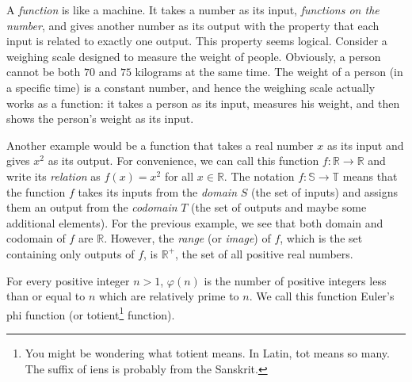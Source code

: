 \documentclass{subfile}
\begin{document}
	A \textit{function} is like a machine. It takes a number as its input, \textit{functions on the number}, and gives another number as its output with the property that each input is related to exactly one output. This property seems logical. Consider a weighing scale designed to measure the weight of people. Obviously, a person cannot be both $70$ and $75$ kilograms at the same time. The weight of a person (in a specific time) is a constant number, and hence the weighing scale actually works as a function: it takes a person as its input, measures his weight, and then shows the person's weight as its input.

	Another example would be a function that takes a real number $x$ as its input and gives $x^2$ as its output. For convenience, we can call this function $f: \mathbb R \to \mathbb R$ and write its \textit{relation} as $f(x) = x^2$ for all $x \in \mathbb R$. The notation $f: \mathbb S \to \mathbb T$ means that the function $f$ takes its inputs from the \textit{domain} $S$ (the set of inputs) and assigns them an output from the \textit{codomain} $T$ (the set of outputs and maybe some additional elements). For the previous example, we see that both domain and codomain of $f$ are $\mathbb R$. However, the \textit{range} (or \textit{image}) of $f$, which is the set containing only outputs of $f$, is $\mathbb R^{+}$, the set of all positive real numbers.

		\begin{definition}\label{def:totient}
			For every positive integer $n>1$, $\varphi(n)$ is the number of positive integers less than or equal to $n$ which are relatively prime to $n$. We call this function Euler's phi function (or totient\footnote{You might be wondering what {totient} means. In Latin, {tot} means so many. The suffix of {iens} is probably from the Sanskrit.} function).
		\end{definition}
\end{document}
